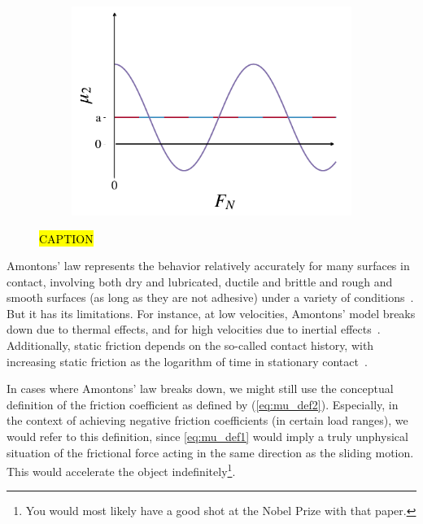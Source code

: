 \begin{figure}[H]
\begin{subfigure}[t]{0.32\textwidth}
      \caption{}
      \label{fig:fric_coef_example_b}
    \end{subfigure}
    \hfill
    \begin{subfigure}[t]{0.32\textwidth}
      \centering
      \includegraphics[width=\textwidth]{figures/theory/fric_coef_example_c.pdf}
      \caption{}
      \label{fig:fric_coef_example_c}
  \end{subfigure}
  \hfill
  \caption{\hl{CAPTION}}
  \label{fig:fric_coef_example}
\end{figure}

Amontons’ law represents the behavior relatively accurately for many surfaces in contact, involving both dry and lubricated, ductile and brittle and rough and smooth surfaces (as long as they are not adhesive) under a variety of conditions~\cite{gao_frictional_2004}. But it has its limitations. For instance, at low velocities, Amontons' model breaks down due to thermal effects, and for high velocities due to inertial effects~\cite[pp.\ 5--6]{gnecco_meyer_2015}. Additionally, static friction depends on the so-called contact history, with increasing static friction as the logarithm of time in stationary contact~\cite{dieterich_1972}.

In cases where Amontons' law breaks down, we might still use the conceptual
definition of the friction coefficient as defined by (\cref{eq:mu_def2}).
Especially, in the context of achieving negative friction coefficients (in
certain load ranges), we would refer to this definition, since \cref{eq:mu_def1}
would imply a truly unphysical situation of the frictional force acting in the
same direction as the sliding motion. This would accelerate the object
indefinitely\footnote{You would most likely have a good shot at the Nobel Prize
with that paper.}.


